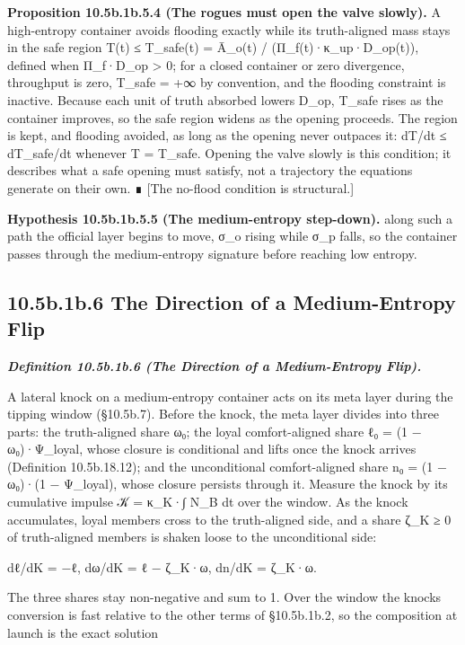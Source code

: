 \documentclass[
]{article}
\begin{document}
\textbf{Proposition 10.5b.1b.5.4 (The rogues must open the valve
slowly).} A high-entropy container avoids flooding exactly while its
truth-aligned mass stays in the safe region T(t) ≤ T\_safe(t) = Ā\_o(t)
/ (Π\_f(t)·κ\_up·D\_op(t)), defined when Π\_f·D\_op \textgreater{} 0;
for a closed container or zero divergence, throughput is zero, T\_safe =
+∞ by convention, and the flooding constraint is inactive. Because each
unit of truth absorbed lowers D\_op, T\_safe rises as the container
improves, so the safe region widens as the opening proceeds. The region
is kept, and flooding avoided, as long as the opening never outpaces it:
dT/dt ≤ dT\_safe/dt whenever T = T\_safe. Opening the valve slowly is
this condition; it describes what a safe opening must satisfy, not a
trajectory the equations generate on their own. ∎ {[}The no-flood
condition is structural.{]}

\textbf{Hypothesis 10.5b.1b.5.5 (The medium-entropy step-down).} along
such a path the official layer begins to move, σ\_o rising while σ\_p
falls, so the container passes through the medium-entropy signature
before reaching low entropy.

\hypertarget{b.1b.6-the-direction-of-a-medium-entropy-flip}{%
\subsection{10.5b.1b.6 The Direction of a Medium-Entropy
Flip}\label{b.1b.6-the-direction-of-a-medium-entropy-flip}}

\emph{\textbf{Definition 10.5b.1b.6 (The Direction of a Medium-Entropy
Flip).}}

A lateral knock on a medium-entropy container acts on its meta layer
during the tipping window (§10.5b.7). Before the knock, the meta layer
divides into three parts: the truth-aligned share ω₀; the loyal
comfort-aligned share ℓ₀ = (1 − ω₀)·Ψ\_loyal, whose closure is
conditional and lifts once the knock arrives (Definition 10.5b.18.12);
and the unconditional comfort-aligned share n₀ = (1 − ω₀)·(1 −
Ψ\_loyal), whose closure persists through it. Measure the knock by its
cumulative impulse 𝒦 = κ\_K·∫ N\_B dt over the window. As the knock
accumulates, loyal members cross to the truth-aligned side, and a share
ζ\_K ≥ 0 of truth-aligned members is shaken loose to the unconditional
side:

dℓ/dK = −ℓ, dω/dK = ℓ − ζ\_K·ω, dn/dK = ζ\_K·ω.

The three shares stay non-negative and sum to 1. Over the window the
knock\textquotesingle s conversion is fast relative to the other terms
of §10.5b.1b.2, so the composition at launch is the exact solution
\end{document}
